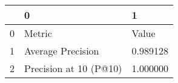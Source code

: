\begin{tabular}{lll}
\toprule
 & 0 & 1 \\
\midrule
0 & Metric & Value \\
1 & Average Precision & 0.989128 \\
2 & Precision at 10 (P@10) & 1.000000 \\
\bottomrule
\end{tabular}
